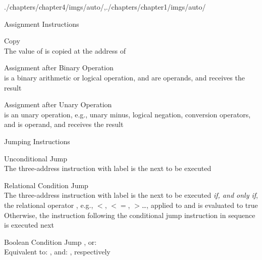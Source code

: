 \begin{graphicspathcontext}{{./chapters/chapter4/imgs/auto/},{./chapters/chapter1/imgs/auto/}}
\begin{bibunit}[apalike]
\begin{frame}{Assignment Instructions}
	\begin{definitionblock}{Copy}
		\emph{} \\
		The value of  is copied at the address of 
	\end{definitionblock}
	\begin{definitionblock}{Assignment after Binary Operation}
		\emph{} \\
		 is a binary arithmetic or logical operation,  and  are operands, and  receives the result
	\end{definitionblock}
	\begin{definitionblock}{Assignment after Unary Operation}
		\emph{} \\
		 is an unary operation, e.g., unary minus, logical negation, conversion operators, and  is operand, and  receives the result
	\end{definitionblock}
\end{frame}

\begin{frame}[t]{Jumping Instructions}
	\begin{definitionblock}{Unconditional Jump}
		\emph{} \\
		The three-address instruction with label  is the next to be executed
	\end{definitionblock}
	\begin{definitionblock}{Relational Condition Jump}
		\emph{} \\
		The three-address instruction with label  is the next to be executed \emph{if, and only if}, the relational operator , e.g., $<$, $<=$, $>$\dots, applied to  and  is evaluated to true \\
		Otherwise, the instruction following the conditional jump instruction in sequence is executed next
	\end{definitionblock}
	\begin{definitionblock}{Boolean Condition Jump}
		\emph{}, or: \emph{} \\
		Equivalent to: , and: , respectively
	\end{definitionblock}
\end{frame}


\end{bibunit}
\end{graphicspathcontext}
